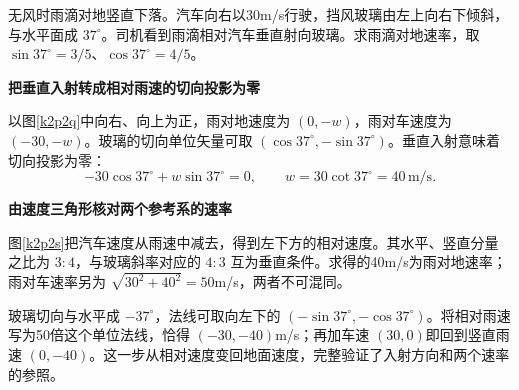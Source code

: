 \begin{question}\begin{example}[挡风玻璃上的垂直入射]\label{k2p2}
无风时雨滴对地竖直下落。汽车向右以30m/s行驶，挡风玻璃由左上向右下倾斜，与水平面成 $37^\circ$。司机看到雨滴相对汽车垂直射向玻璃。求雨滴对地速率，取 $\sin37^\circ=3/5$、$\cos37^\circ=4/5$。\end{example}
\end{question}
\begin{solution}\textbf{把垂直入射转成相对雨速的切向投影为零}\par\nobreak
以图\ref{k2p2q}中向右、向上为正，雨对地速度为 $(0,-w)$，雨对车速度为 $(-30,-w)$。玻璃的切向单位矢量可取 $(\cos37^\circ,-\sin37^\circ)$。垂直入射意味着切向投影为零：
\[-30\cos37^\circ+w\sin37^\circ=0,\qquad\boxed{w=30\cot37^\circ=40\,\mathrm{m/s}}.\]


\par\medskip{}\noindent\textbf{由速度三角形核对两个参考系的速率}\par\nobreak
图\ref{k2p2s}把汽车速度从雨速中减去，得到左下方的相对速度。其水平、竖直分量之比为 $3:4$，与玻璃斜率对应的 $4:3$ 互为垂直条件。求得的40m/s为雨对地速率；雨对车速率另为 $\sqrt{30^2+40^2}=50$m/s，两者不可混同。

玻璃切向与水平成 $-37^\circ$，法线可取向左下的 $(-\sin37^\circ,-\cos37^\circ)$。将相对雨速写为50倍这个单位法线，恰得 $(-30,-40)$m/s；再加车速 $(30,0)$即回到竖直雨速 $(0,-40)$。这一步从相对速度变回地面速度，完整验证了入射方向和两个速率的参照。\end{solution}

